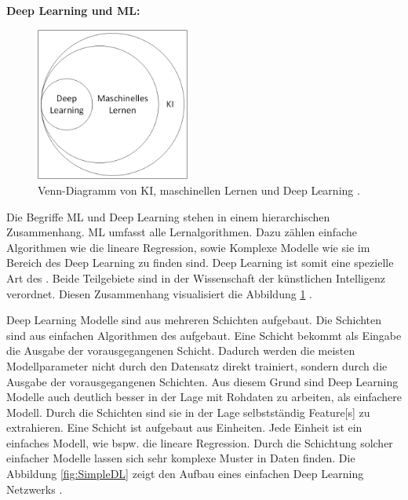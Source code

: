 \textbf{\gls{Deep Learning} und \gls{ML}:}\\
\begin{figure}
    \begin{center}
        \vspace*{-9mm}
        \includegraphics[width=0.45\textwidth]{img/Grafiken/Ki-ML und Deep Learning Ven.png}
        \vspace*{-10mm}
        \caption[Venn-Diagramm von KI, maschinellen Lernen und Deep Learning.]{Venn-Diagramm von KI, maschinellen Lernen und Deep Learning \cite{Goodfellow.2016}.}
        \label{fig:zusammenhangDL_ML}
    \end{center}
\end{figure}
Die Begriffe \gls{ML} und \gls{Deep Learning} stehen in einem hierarchischen Zusammenhang. \Gls{ML} umfasst alle Lernalgorithmen. Dazu zählen einfache Algorithmen wie die lineare Regression, sowie Komplexe Modelle wie sie im Bereich des \gls{Deep Learning} zu finden sind. \gls{Deep Learning} ist somit eine spezielle Art des . Beide Teilgebiete sind in der Wissenschaft der künstlichen Intelligenz verordnet. Diesen Zusammenhang visualisiert die Abbildung \ref{fig:zusammenhangDL_ML} \cite{Goodfellow.2016, Burkov.2019}.



\gls{Deep Learning} Modelle sind aus mehreren Schichten aufgebaut. Die Schichten sind aus einfachen Algorithmen des  aufgebaut. Eine Schicht bekommt als Eingabe die Ausgabe der vorausgegangenen Schicht. Dadurch werden die meisten Modellparameter nicht durch den Datensatz direkt trainiert, sondern durch die Ausgabe der vorausgegangenen Schichten. Aus diesem Grund sind \gls{Deep Learning} Modelle auch deutlich besser in der Lage mit Rohdaten zu arbeiten, als einfachere Modell. Durch die Schichten sind sie in der Lage selbstständig \gls{Feature}[s] zu extrahieren. Eine Schicht ist aufgebaut aus Einheiten. Jede Einheit ist ein einfaches Modell, wie bspw. die lineare Regression. Durch die Schichtung solcher einfacher Modelle lassen sich sehr komplexe Muster in Daten finden. Die Abbildung \ref{fig:SimpleDL} zeigt den Aufbau eines einfachen \gls{Deep Learning} Netzwerks \cite{Burkov.2019, Goodfellow.2016}. 

